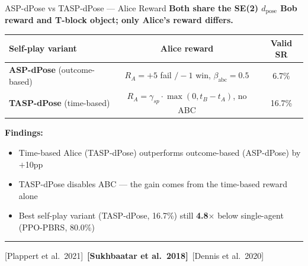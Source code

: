 \documentclass[aspectratio=169,xcolor=dvipsnames,t]{beamer}
\newcommand{\litfooter}[1]{%
  \vspace{2pt}%
  \hrule%
  \vspace{2pt}%
  {\tiny\color{LightDarkGrey} #1}%
}
\begin{document}
\begin{frame}[t]{ASP-dPose vs TASP-dPose — Alice Reward}
  \textbf{Both share the SE(2) $d_{\text{pose}}$ Bob reward and T-block object; only Alice's reward differs.}

  \vspace{4pt}
  \begin{center}
  \small
  \begin{tabular}{lcc}
    \toprule
    \textbf{Self-play variant} & \textbf{Alice reward} & \textbf{Valid SR} \\
    \midrule
    \textbf{ASP-dPose} (outcome-based) & $R_A=+5$ fail $/-1$ win, $\beta_{\text{abc}}{=}0.5$ & \textcolor{hlred}{6.7\%} \\
    \textbf{TASP-dPose} (time-based) & $R_A=\gamma_{sp}\!\cdot\!\max(0,t_B\!-\!t_A)$, no ABC & \textcolor{hlred}{16.7\%} \\
    \bottomrule
  \end{tabular}
  \end{center}

  \vspace{4pt}
  \textbf{Findings:}
  \begin{itemize}
    \item Time-based Alice (TASP-dPose) outperforms outcome-based (ASP-dPose) by $+$10pp
    \item TASP-dPose disables ABC — the gain comes from the time-based reward alone
    \item Best self-play variant (TASP-dPose, 16.7\%) still \textbf{4.8$\times$} below single-agent (PPO-PBRS, 80.0\%)
  \end{itemize}

  \vfill\litfooter{[Plappert et al.\ 2021]~\textbf{[Sukhbaatar et al.\ 2018]}~[Dennis et al.\ 2020]}
\end{frame}

\end{document}
